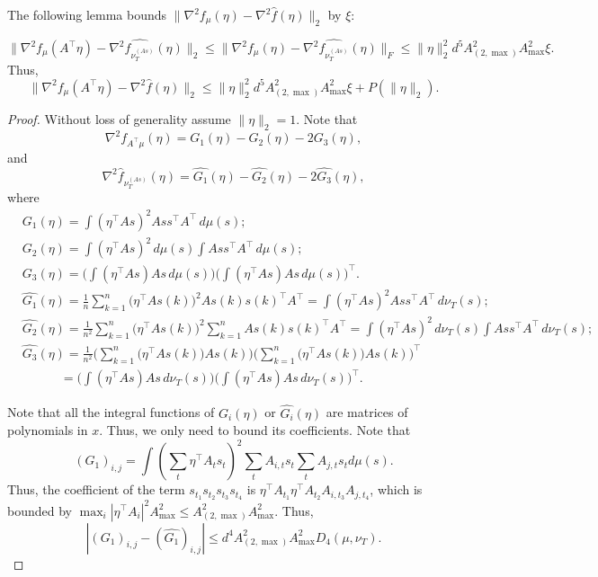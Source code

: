 The following lemma bounds $\|\nabla^2 f_{\mu}(\eta) - \nabla^2 \hat{f}(\eta) \|_2$ by $\xi$:
\begin{lemma}
\label{lem:nablavariation}
\[
\|\nabla^2 f_{\mu}(A^{\top}\eta) - \nabla^2 \hat{f_{\nu_T^{(As)}}}(\eta)  \|_2 \le \|\nabla^2 f_{\mu}(\eta) - \nabla^2 \hat{f_{\nu_T^{(As)}}}(\eta)  \|_F\le  \|\eta\|_2^2  d^5 A_{(2,\max)}^2A_{\max}^2\xi.
\]
Thus, 
\[
\|\nabla^2 f_{\mu}(A^{\top}\eta) - \nabla^2\hat{f}(\eta)\|_2 \le  \|\eta\|_2^2  d^5 A_{(2,\max)}^2A_{\max}^2\xi + P(\|\eta\|_2).
\]
\end{lemma}
\begin{proof}
Without loss of generality assume $\|\eta\|_2 = 1$.
Note that  
\[
\nabla^2 f_{A^{\top}\mu}(\eta) = G_1(\eta) - G_2(\eta) -2G_3(\eta),
\]
and 
\[
\nabla^2 \hat{f}_{\nu_T^{(As)}}(\eta) =\hat{G_1}(\eta) - \hat{G_2}(\eta) -2\hat{G_3}(\eta),
\]
where 
\begin{align*}
& G_1(\eta) = \int (\eta^{\top}As)^2Ass^{\top}A^{\top}\,d\mu(s); \\
& G_2(\eta) = \int (\eta^{\top}As)^2\,d\mu(s) \int Ass^{\top}A^{\top} \,d\mu(s); \\
& G_3(\eta) = \Big(\int (\eta^{\top}As)As\,d\mu(s)\Big)\Big(\int (\eta^{\top}As)As\,d\mu(s)\Big)^{\top}. \\
&\hat{ G_1}(\eta) = \frac1n\sum_{k=1}^{n} \big(\eta^{\top}As(k)\big)^2As(k)s(k)^{\top}A^{\top} = \int (\eta^{\top}As)^2Ass^{\top}A^{\top}\,d\nu_T(s); \\
& \hat{G_2}(\eta) = \frac{1}{n^2}\sum_{k=1}^{n} \big(\eta^{\top}As(k)\big)^2 \sum_{k=1}^{n}As(k)s(k)^{\top}A^{\top} = \int (\eta^{\top}As)^2\,d\nu_T(s) \int Ass^{\top}A^{\top} \,d\nu_T(s); \\
& \hat{G_3}(\eta) = \frac{1}{n^2}\Big(\sum_{k=1}^{n} \big(\eta^{\top}As(k)\big)As(k)\Big) \Big(\sum_{k=1}^{n} \big(\eta^{\top}As(k)\big)As(k)\Big)^{\top} \\
&  \quad \quad \quad = \Big(\int (\eta^{\top}As)As\,d\nu_T(s)\Big)\Big(\int (\eta^{\top}As)As\,d\nu_T(s)\Big)^{\top}.
\end{align*}

Note that all the integral functions of $G_i(\eta)$ or $\hat{G_i}(\eta)$ are matrices of polynomials in $x$. Thus, we only need to bound its coefficients.
Note that 
\[
\left(G_1\right)_{i,j} = \int (\sum_t \eta^{\top}A_ts_t)^2\sum_t A_{i,t}s_t \sum_t A_{j,t}s_t d\mu(s).
\]
Thus, the coefficient of the term $s_{t_1}s_{t_2}s_{t_3}s_{t_4}$ is $\eta^{\top}A_{t_1}\eta^{\top}A_{t_2}A_{i,t_3}A_{j,t_4}$, 
which is bounded by $\max_i |\eta^{\top} A_i|^2 A_{\max}^2 \le A_{(2,\max)}^2A_{\max}^2$. 
Thus,
\[
\left| (G_1)_{i,j} - (\hat{G_1})_{i,j} \right| \le d^4  A_{(2,\max)}^2A_{\max}^2D_4(\mu, \nu_T).
\]


\end{proof}
